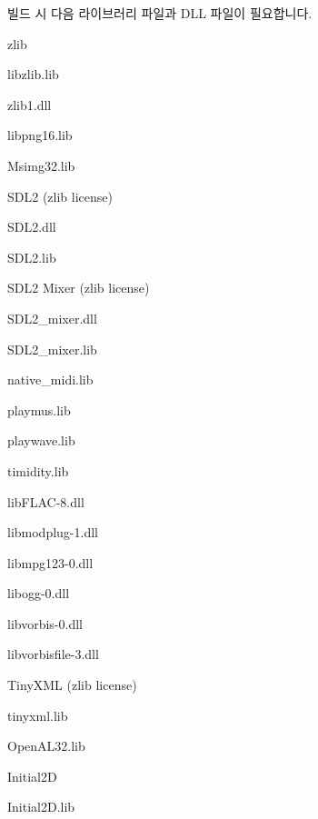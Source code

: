 빌드 시 다음 라이브러리 파일과 D\+LL 파일이 필요합니다.


\begin{DoxyItemize}
\item zlib
\begin{DoxyItemize}
\item libzlib.\+lib
\item zlib1.\+dll
\item libpng16.\+lib
\end{DoxyItemize}
\item Msimg32.\+lib
\item S\+D\+L2 (zlib license)
\begin{DoxyItemize}
\item S\+D\+L2.\+dll
\item S\+D\+L2.\+lib
\end{DoxyItemize}
\item S\+D\+L2 Mixer (zlib license)
\begin{DoxyItemize}
\item S\+D\+L2\+\_\+mixer.\+dll
\item S\+D\+L2\+\_\+mixer.\+lib
\item native\+\_\+midi.\+lib
\item playmus.\+lib
\item playwave.\+lib
\item timidity.\+lib
\item lib\+F\+L\+A\+C-\/8.\+dll
\item libmodplug-\/1.\+dll
\item libmpg123-\/0.\+dll
\item libogg-\/0.\+dll
\item libvorbis-\/0.\+dll
\item libvorbisfile-\/3.\+dll
\end{DoxyItemize}
\item Tiny\+X\+ML (zlib license)
\begin{DoxyItemize}
\item tinyxml.\+lib
\item Open\+A\+L32.\+lib
\end{DoxyItemize}
\item Initial2D
\begin{DoxyItemize}
\item Initial2\+D.\+lib 
\end{DoxyItemize}
\end{DoxyItemize}